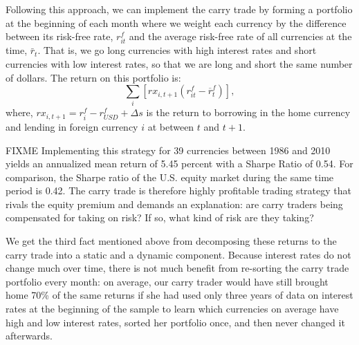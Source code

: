 \documentclass{ar-1col}
\begin{document}
Following this approach, we can implement the carry trade by forming a portfolio at the beginning of each month where we weight each currency by the difference between its risk-free rate, $r^f_{it}$ and the average risk-free rate of all currencies at the time, $\bar{r}_t$. That is, we go long currencies with high interest rates and short currencies with low interest rates, so that we are long and short the same number of dollars. The return on this portfolio is:
\begin{equation}
  \label{eq_carry}
  \textstyle\sum_{i}\left[ rx_{i,t+1}\left( r^f_{it}-\overline{r}^f_{t}\right) \right] ,
\end{equation}%
where, $rx_{i,t+1}=r^f_i-r^f_{USD}+\Delta s$ is the return to borrowing in the home currency and lending in foreign currency $i$ at between $t$ and $t+1$.

FIXME Implementing this strategy for 39 currencies between 1986 and 2010 yields an annualized mean return of 5.45 percent with a Sharpe Ratio of 0.54. For comparison, the Sharpe ratio of the U.S. equity market during the same time period is 0.42. The carry trade is therefore highly profitable trading strategy that rivals the equity premium and demands an explanation: are carry traders being compensated for taking on risk? If so, what kind of risk are they taking?

We get the third fact mentioned above from decomposing these returns to the carry trade into a static and a dynamic component. Because interest rates do not change much over time, there is not much benefit from re-sorting the carry trade portfolio every month: on average, our carry trader would have still brought home 70\% of the same returns if she had used only three years of data on interest rates at the beginning of the sample to learn which currencies on average have high and low interest rates, sorted her portfolio once, and then never changed it afterwards.
\end{document}
